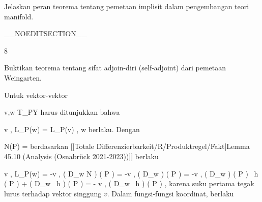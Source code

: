 {

Jelaskan peran teorema tentang pemetaan implisit dalam pengembangan teori manifold.

}
{  }

__NOEDITSECTION__

{8}

{

Buktikan teorema tentang sifat adjoin-diri (self-adjoint) dari pemetaan Weingarten.

}
{

Untuk vektor-vektor

\mavergleichskette
{\vergleichskette
{ v,w
}
{ \in }{ T_PY
}
{  }{
}
{    }{
}
{   }{
}
}
{}{}{}
harus ditunjukkan bahwa

\mavergleichskettedisp
{\vergleichskette
{ \left\langle  v  ,  L_P(w)  \right\rangle
}
{ =} { \left\langle L_P(v) ,  w  \right\rangle
}
{ } {
}
{ } {
}
{ } {
}
}
{}{}{}
berlaku. Dengan

\mavergleichskette
{\vergleichskette
{ N(P)
}
{ = }{ {  }
}
{  }{
}
{    }{
}
{   }{
}
}
{}{}{}
berdasarkan
[[Totale Differenzierbarkeit/R/Produktregel/Fakt|Lemma 45.10 (Analysis (Osnabrück 2021-2023))]]
berlaku

\mavergleichskettealignhandlinks
{\vergleichskettealignhandlinks
{ \left\langle  v  ,  L_P(w)  \right\rangle
}
{ =} { -\left\langle  v  ,  \left(  D_{w}  N   \right) \left(   P   \right)   \right\rangle
}
{ =} { -\left\langle  v  ,  \left(  D_{w}  {  }   \right) \left(   P   \right)     \right\rangle
}
{ =} { -\left\langle  v  ,  \left(  D_{w}  {  }   \right) \left(   P   \right) \cdot
{} \,  h  (  P ) + {  } \cdot  \left(  D_{w}
 \,  h   \right) \left(   P   \right)   \right\rangle
}
{ =} { - {  } \left\langle  v  ,  \left(  D_{w}
 \,  h   \right) \left(   P   \right)    \right\rangle
}
}
{}
{}{,}
karena suku pertama tegak lurus terhadap vektor singgung $v$. Dalam fungsi-fungsi koordinat, berlaku

}

